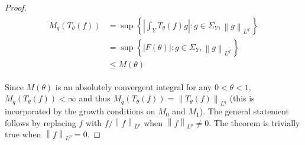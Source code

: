 \begin{proof}
	\begin{gather*}
		\begin{aligned}
			M_q\left(T_\theta(f)\right) &= \sup\left\{ \left| \int_Y T_\theta(f) g\right| : g \in \Sigma_Y, \left\|g \right\|_{L^{q'}}\right\}\\
			&= \sup\left\{ \left| F(\theta)\right| : g \in \Sigma_Y, \left\| g \right\|_{L^{q'}}\right\}\\
			&\leq M(\theta)
		\end{aligned}
	\end{gather*}

	Since $M(\theta)$ is an absolutely convergent integral for any $0 < \theta < 1$, $M_q\left(T_\theta(f)\right) < \infty$ and thus $M_q\left(T_\theta(f)\right) = \left\| T_\theta(f)\right\|_{L^q}$ (this is incorporated by the growth conditions on $M_0$ and $M_1$). The general statement follows by replacing $f$ with $f/\left\| f\right\|_{L^p}$ when $\left\|f \right\|_{L^p} \neq 0$. The theorem is trivially true when $\left\| f\right\|_{L^p} = 0$.
\end{proof}

